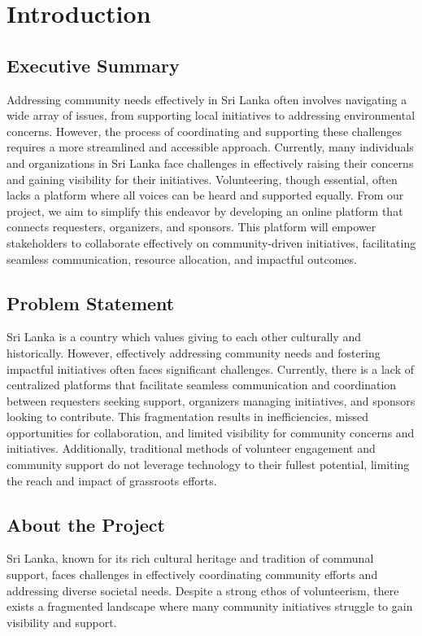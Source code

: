 \section{Introduction}
\subsection{Executive Summary}

Addressing community needs effectively in Sri Lanka often involves navigating a wide array of issues, from supporting local initiatives to addressing environmental concerns. However, the process of coordinating and supporting these challenges requires a more streamlined and accessible approach. Currently, many individuals and organizations in Sri Lanka face challenges in effectively raising their concerns and gaining visibility for their initiatives. Volunteering, though essential, often lacks a platform where all voices can be heard and supported equally. From our project, we aim to simplify this endeavor by developing an online platform that connects requesters, organizers, and sponsors. This platform will empower stakeholders to collaborate effectively on community-driven initiatives, facilitating seamless communication, resource allocation, and impactful outcomes.

\subsection{Problem Statement}
Sri Lanka is a country which values giving to each other culturally and historically. However, effectively addressing community needs and fostering impactful initiatives often faces significant challenges. Currently, there is a lack of centralized platforms that facilitate seamless communication and coordination between requesters seeking support, organizers managing initiatives, and sponsors looking to contribute. This fragmentation results in inefficiencies, missed opportunities for collaboration, and limited visibility for community concerns and initiatives. Additionally, traditional methods of volunteer engagement and community support do not leverage technology to their fullest potential, limiting the reach and impact of grassroots efforts.


\subsection{About the Project}
Sri Lanka, known for its rich cultural heritage and tradition of communal support, faces challenges in effectively coordinating community efforts and addressing diverse societal needs. Despite a strong ethos of volunteerism, there exists a fragmented landscape where many community initiatives struggle to gain visibility and support.

